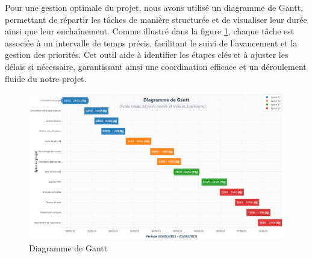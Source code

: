 Pour une gestion optimale du projet, nous avons utilisé un diagramme de Gantt, permettant de répartir les tâches de manière structurée et de visualiser leur durée ainsi que leur enchaînement. 
Comme illustré dans la figure \ref{fig:gantt}, chaque tâche est associée à un intervalle de temps précis, facilitant le suivi de l'avancement et la gestion des priorités. Cet outil aide à identifier les étapes clés et à ajuster les délais si nécessaire, garantissant ainsi une coordination efficace et un déroulement fluide du notre projet.
\begin{figure}[H]
    \centering
    \includegraphics[width=\linewidth]{chapitres/ch2/img/gantt-last.png}
    \caption{Diagramme de Gantt}
    \label{fig:gantt}
\end{figure}
\vspace{-0.5cm}